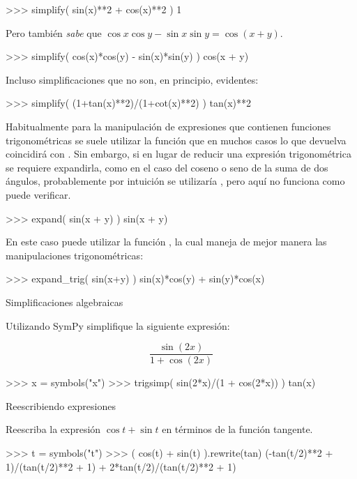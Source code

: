 \begin{python}
>>> simplify( sin(x)**2 + cos(x)**2 )
1
\end{python}

Pero también \textit{sabe} que $ \cos x \cos y - \sin x \sin y = \cos(x+y) $.

\begin{python}
>>> simplify( cos(x)*cos(y) - sin(x)*sin(y) )
cos(x + y)
\end{python}

Incluso simplificaciones que no son, en principio, evidentes:

\begin{python}
>>> simplify( (1+tan(x)**2)/(1+cot(x)**2) )
tan(x)**2
\end{python}

Habitualmente para la manipulación de expresiones que contienen funciones trigonométricas se suele utilizar 
la función  que en muchos casos lo que devuelva coincidirá con . 
Sin embargo, si en lugar de reducir una expresión trigonométrica se requiere expandirla, como 
en el caso del coseno o seno de la suma de dos ángulos, probablemente por intuición se utilizaría , 
pero aquí no funciona como puede verificar.

\begin{python}
>>> expand( sin(x + y) )
sin(x + y)
\end{python}

En este caso puede utilizar la función , la cual maneja de mejor manera las manipulaciones trigonométricas:

\begin{python}
>>> expand_trig( sin(x+y) )
sin(x)*cos(y) + sin(y)*cos(x)
\end{python}


\begin{ejemplo}{Simplificaciones algebraicas}

Utilizando SymPy simplifique la siguiente expresión:

$$ \frac{\sin(2x)}{1 + \cos(2x)} $$

\solu

\begin{python}
>>> x = symbols("x")
>>> trigsimp( sin(2*x)/(1 + cos(2*x)) )
tan(x)
\end{python}
\end{ejemplo}


\begin{ejemplo}{Reescribiendo expresiones}

Reescriba la expresión $ \cos t + \sin t $ en términos de la función tangente.

\solu

\begin{python}
>>> t = symbols("t")
>>> ( cos(t) + sin(t) ).rewrite(tan)
(-tan(t/2)**2 + 1)/(tan(t/2)**2 + 1) + 2*tan(t/2)/(tan(t/2)**2 + 1)
\end{python}
\end{ejemplo}


